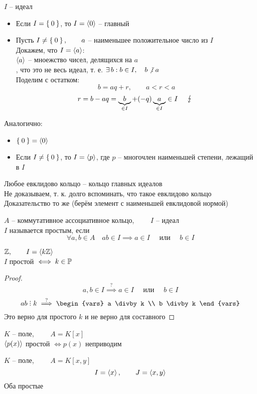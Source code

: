 \begin{eproof}
	\item $ I $ -- идеал
	\begin{itemize}
		\item Если $ I = \Set{0} $, то $ I = \Braket{0} $ -- главный
		\item Пусть $ I \ne \Set{0}, \qquad a $ -- наименьшее положительное число из $ I $ \\
		Докажем, что $ I = \Braket{a} $: \\
		$ \Braket{a} $ -- мноежство чисел, делящихся на $ a $ \\
		, что это не весь идеал, т. е. $ \exist b : b \in I, \quad b \ndivby a $ \\
		Поделим с остатком:
		$$ b = aq + r, \qquad a < r < a $$
		$$ r = b - aq = \underbrace{b}_{\in I} + (-q)\underbrace{a}_{\in I} \in I \quad \contra $$
	\end{itemize}

	\item Аналогично:
	\begin{itemize}
		\item $ \Set{0} = \Braket{0} $
		\item Если $ I \ne \Set{0} $, то $ I = \Braket{p} $, где $ p $ -- многочлен наименьшей степени, лежащий в $ I $
	\end{itemize}
\end{eproof}

\begin{remark}
	Любое евклидово кольцо -- кольцо главных идеалов \\
	Не доказываем, т. к. долго вспоминать, что такое евклидово кольцо \\
	Доказательство то же (берём элемент с наименьшей евклидовой нормой)
\end{remark}

\begin{definition}
	$ A $ -- коммутативное ассоциативное кольцо, $ \qquad I $ -- идеал \\
	$ I $ называется простым, если
	$$ \forall a, b \in A \quad ab \in I \implies a \in I \quad \text{ или } \quad b \in I $$
\end{definition}

\begin{eg}
	\item $ \mathbb{Z}, \qquad I = \Braket{k\mathbb{Z}} $ \\
	$ I $ простой $ \iff k \in \mathbb{P} $
	\begin{proof}
		$$ a, b \in I \stackrel?\implies a \in I \quad \text{ или } \quad b \in I $$
		$$ ab \divby k \stackrel?\implies
		\begin{vars}
			a \divby k \\
			b \divby k
		\end{vars} $$
		Это верно для простого $ k $ и не верно для составного
	\end{proof}
	\item $ K $ -- поле, $ \qquad A = K[x] $ \\
	$ \Braket{p(x)} $ простой $ \iff p(x) $ неприводим
	\item $ K $ -- поле, $ \qquad A = K[x, y] $
	$$ I = \Braket{x}, \qquad J = \Braket{x, y} $$
	Оба простые
\end{eg}

